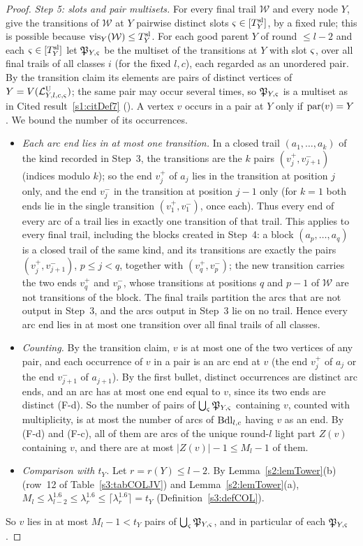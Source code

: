 \begin{proof}
\emph{Step 5: slots and pair multisets.} For every final trail $\mathcal W$ and every node $Y$, give the transitions of $\mathcal W$ at $Y$ pairwise distinct slots $\varsigma\in[T^{\mathrm{sl}}_Y]$, by a fixed rule; this is possible because $\mathrm{vis}_Y(\mathcal W)\le T^{\mathrm{sl}}_Y$. For each good parent $Y$ of round $\le l-2$ and each $\varsigma\in[T^{\mathrm{sl}}_Y]$ let $\mathfrak P_{Y,\varsigma}$ be the multiset of the transitions at $Y$ with slot $\varsigma$, over all final trails of all classes $i$ (for the fixed $l,c$), each regarded as an unordered pair. By the transition claim its elements are pairs of distinct vertices of $Y=V(\mathcal{L}^{\mathrm{U}}_{Y,l,c,\varsigma})$; the same pair may occur several times, so $\mathfrak P_{Y,\varsigma}$ is a multiset as in Cited result~\ref{s1:citDef7} (). A vertex $v$ occurs in a pair at $Y$ only if $\mathrm{par}(v)=Y$. We bound the number of its occurrences.
\begin{itemize}
\item \emph{Each arc end lies in at most one transition.} In a closed trail $(a_1,\dots,a_k)$ of the kind recorded in Step~3, the transitions are the $k$ pairs $(v_j^+,v_{j+1}^-)$ (indices modulo $k$); so the end $v_j^+$ of $a_j$ lies in the transition at position $j$ only, and the end $v_j^-$ in the transition at position $j-1$ only (for $k=1$ both ends lie in the single transition $(v_1^+,v_1^-)$, once each). Thus every end of every arc of a trail lies in exactly one transition of that trail. This applies to every final trail, including the blocks created in Step~4: a block $(a_p,\dots,a_q)$ is a closed trail of the same kind, and its transitions are exactly the pairs $(v_j^+,v_{j+1}^-)$, $p\le j<q$, together with $(v_q^+,v_p^-)$; the new transition carries the two ends $v_q^+$ and $v_p^-$, whose transitions at positions $q$ and $p-1$ of $\mathcal W$ are not transitions of the block. The final trails partition the arcs that are not output in Step~3, and the arcs output in Step~3 lie on no trail. Hence every arc end lies in at most one transition over all final trails of all classes.
\item \emph{Counting.} By the transition claim, $v$ is at most one of the two vertices of any pair, and each occurrence of $v$ in a pair is an arc end at $v$ (the end $v_j^+$ of $a_j$ or the end $v_{j+1}^-$ of $a_{j+1}$). By the first bullet, distinct occurrences are distinct arc ends, and an arc has at most one end equal to $v$, since its two ends are distinct (F-d). So the number of pairs of $\bigcup_{\varsigma}\mathfrak P_{Y,\varsigma}$ containing $v$, counted with multiplicity, is at most the number of arcs of $\mathrm{Bdl}_{l,c}$ having $v$ as an end. By (F-d) and (F-c), all of them are arcs of the unique round-$l$ light part $Z(v)$ containing $v$, and there are at most $|Z(v)|-1\le M_l-1$ of them.
\item \emph{Comparison with $t_Y$.} Let $r=r(Y)\le l-2$. By Lemma~\ref{s2:lemTower}(b) (row~12 of Table~\ref{s3:tabCOLJV}) and Lemma~\ref{s2:lemTower}(a), $M_l\le\lambda_{l-2}^{1.6}\le\lambda_r^{1.6}\le\lceil\lambda_r^{1.6}\rceil=t_Y$ (Definition~\ref{s3:defCOL}).
\end{itemize}
So $v$ lies in at most $M_l-1<t_Y$ pairs of $\bigcup_{\varsigma}\mathfrak P_{Y,\varsigma}$, and in particular of each $\mathfrak P_{Y,\varsigma}$.


\end{proof}
